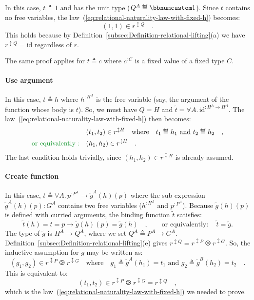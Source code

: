 In this case, $t\triangleq1$ and has the unit type ($Q^{A}\triangleq\bbnum 1$).
Since $t$ contains no free variables, the law~(\ref{eq:relational-naturality-law-with-fixed-h})
becomes:
\[
(1,1)\in r^{\updownarrow Q}\quad.
\]
This holds because by Definition~\ref{subsec:Definition-relational-lifting}(a)
we have $r^{\updownarrow Q}=\text{id}$ regardless of $r$.

The same proof applies for $t\triangleq c$ where $c^{:C}$ is a fixed
value of a fixed type $C$.

\paragraph{Use argument}

In this case, $t\triangleq h$ where $h^{:H^{A}}$ is the free variable
(say, the argument of the function whose body is $t$). So, we must
have $Q=H$ and $\tilde{t}=\forall A.\,\text{id}^{:H^{A}\rightarrow H^{A}}$.
The law~(\ref{eq:relational-naturality-law-with-fixed-h}) then becomes:
\begin{align*}
 & (t_{1},t_{2})\in r^{\updownarrow H}\quad\text{where}\quad t_{1}\triangleq h_{1}\text{ and }t_{2}\triangleq h_{2}\quad,\\
{\color{greenunder}\text{or equivalently}:}\quad & (h_{1},h_{2})\in r^{\updownarrow H}\quad.
\end{align*}
The last condition holds trivially, since $(h_{1},h_{2})\in r^{\updownarrow H}$
is already assumed.

\paragraph{Create function}

In this case, $t\triangleq\forall A.\,p^{:P^{A}}\rightarrow\tilde{g}^{A}(h)(p)$
where the sub-expression $\tilde{g}^{A}(h)(p):G^{A}$ contains two
free variables ($h^{:H^{A}}$ and $p^{:P^{A}}$). Because $\tilde{g}(h)(p)$
is defined with curried arguments, the binding function $\tilde{t}$
satisfies:
\[
\tilde{t}(h)=t=p\rightarrow\tilde{g}(h)(p)=\tilde{g}(h)\quad,\quad\quad\text{or equivalently}:\quad\tilde{t}=\tilde{g}.
\]
The type of $\tilde{g}$ is $H^{A}\rightarrow Q^{A}$, where we set
$Q^{A}\triangleq P^{A}\rightarrow G^{A}$. Definition~\ref{subsec:Definition-relational-lifting}(e)
gives $r^{\updownarrow Q}=r^{\updownarrow P}\ogreaterthan r^{\updownarrow G}$.
So, the inductive assumption for $g$ may be written as:
\[
(g_{1},g_{2})\in r^{\updownarrow P}\ogreaterthan r^{\updownarrow G}\quad\text{where}\quad g_{1}\triangleq\tilde{g}^{A}(h_{1})=t_{1}\text{ and }g_{2}\triangleq\tilde{g}^{B}(h_{2})=t_{2}\quad.
\]
This is equivalent to:
\[
(t_{1},t_{2})\in r^{\updownarrow P}\ogreaterthan r^{\updownarrow G}=r^{\updownarrow Q}\quad,
\]
which is the law~(\ref{eq:relational-naturality-law-with-fixed-h})
we needed to prove.

